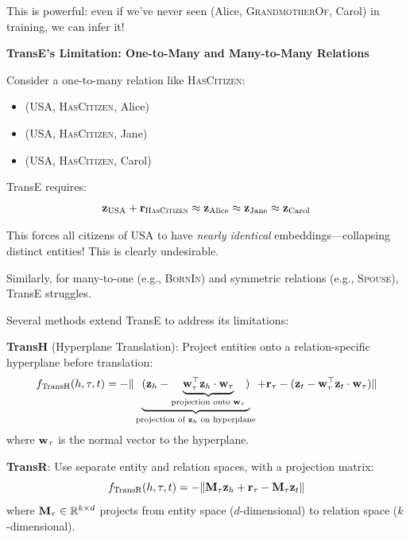 \begin{notechapter}
\begin{example}
This is powerful: even if we've never seen (Alice, \textsc{GrandmotherOf}, Carol) in training, we can infer it!
\end{example}

\begin{keyinsight}
\textbf{TransE's Limitation: One-to-Many and Many-to-Many Relations}

Consider a one-to-many relation like \textsc{HasCitizen}:
\begin{itemize}
    \item (USA, \textsc{HasCitizen}, Alice)
    \item (USA, \textsc{HasCitizen}, Jane)
    \item (USA, \textsc{HasCitizen}, Carol)
\end{itemize}

TransE requires:
\[
\mathbf{z}_{\text{USA}} + \mathbf{r}_{\textsc{HasCitizen}} \approx \mathbf{z}_{\text{Alice}} \approx \mathbf{z}_{\text{Jane}} \approx \mathbf{z}_{\text{Carol}}
\]

This forces all citizens of USA to have \emph{nearly identical} embeddings---collapsing distinct entities! This is clearly undesirable.

Similarly, for many-to-one (e.g., \textsc{BornIn}) and symmetric relations (e.g., \textsc{Spouse}), TransE struggles.
\end{keyinsight}

\begin{definition}
Several methods extend TransE to address its limitations:

\textbf{TransH} (Hyperplane Translation): Project entities onto a relation-specific hyperplane before translation:
\begin{equation}
f_{\text{TransH}}(h, \tau, t) = - \|
\underbrace{( \mathbf{z}_h - \underbrace{\mathbf{w}_\tau^\top \mathbf{z}_h \cdot
\mathbf{w}_\tau}_{\text{projection onto } \mathbf{w}_\tau})}_{\text{projection of } \mathbf{z}_h \text{ on hyperplane}} 
+ \mathbf{r}_\tau
- (\mathbf{z}_t - \mathbf{w}_\tau^\top \mathbf{z}_t \cdot \mathbf{w}_\tau) 
\|
\end{equation}
where $\mathbf{w}_\tau$ is the normal vector to the hyperplane.

\textbf{TransR}: Use separate entity and relation spaces, with a projection matrix:
\begin{equation}
f_{\text{TransR}}(h, \tau, t) = -\|\mathbf{M}_\tau \mathbf{z}_h + \mathbf{r}_\tau - \mathbf{M}_\tau \mathbf{z}_t\|
\end{equation}
where $\mathbf{M}_\tau \in \mathbb{R}^{k \times d}$ projects from entity space ($d$-dimensional) to relation space ($k$-dimensional).
\end{definition}


\end{notechapter}
